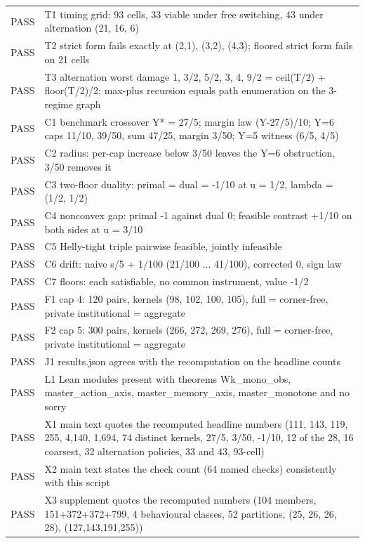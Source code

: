 \begin{longtable}{lp{}}
PASS & T1 timing grid: 93 cells, 33 viable under free switching, 43 under alternation (21, 16, 6) \\
PASS & T2 strict form fails exactly at (2,1), (3,2), (4,3); floored strict form fails on 21 cells \\
PASS & T3 alternation worst damage 1, 3/2, 5/2, 3, 4, 9/2 = ceil(T/2) + floor(T/2)/2; max-plus recursion equals path enumeration on the 3-regime graph \\
PASS & C1 benchmark crossover Y* = 27/5; margin law (Y-27/5)/10; Y=6 caps 11/10, 39/50, sum 47/25, margin 3/50; Y=5 witness (6/5, 4/5) \\
PASS & C2 radius: per-cap increase below 3/50 leaves the Y=6 obstruction, 3/50 removes it \\
PASS & C3 two-floor duality: primal = dual = -1/10 at u = 1/2, lambda = (1/2, 1/2) \\
PASS & C4 nonconvex gap: primal -1 against dual 0; feasible contrast +1/10 on both sides at u = 3/10 \\
PASS & C5 Helly-tight triple pairwise feasible, jointly infeasible \\
PASS & C6 drift: naive s/5 + 1/100 (21/100 ... 41/100), corrected 0, sign law \\
PASS & C7 floors: each satisfiable, no common instrument, value -1/2 \\
PASS & F1 cap 4: 120 pairs, kernels (98, 102, 100, 105), full = corner-free, private institutional = aggregate \\
PASS & F2 cap 5: 300 pairs, kernels (266, 272, 269, 276), full = corner-free, private institutional = aggregate \\
PASS & J1 results.json agrees with the recomputation on the headline counts \\
PASS & L1 Lean modules present with theorems Wk\_mono\_obs, master\_action\_axis, master\_memory\_axis, master\_monotone and no sorry \\
PASS & X1 main text quotes the recomputed headline numbers (111, 143, 119, 255, 4,140, 1,694, 74 distinct kernels, 27/5, 3/50, -1/10, 12 of the 28, 16 coarsest, 32 alternation policies, 33 and 43, 93-cell) \\
PASS & X2 main text states the check count (64 named checks) consistently with this script \\
PASS & X3 supplement quotes the recomputed numbers (104 members, 151+372+372+799, 4 behavioural classes, 52 partitions, (25, 26, 26, 28), (127,143,191,255)) \\
\end{longtable}
